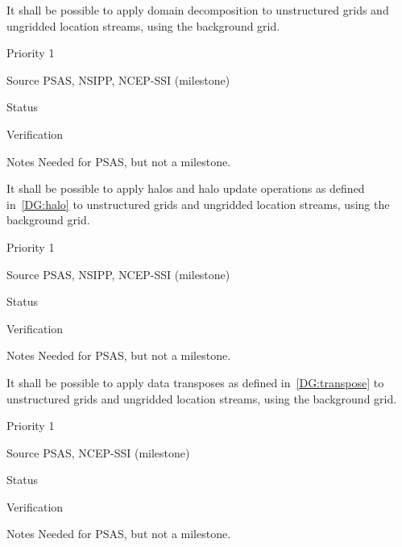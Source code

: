 
It shall be possible to apply domain decomposition to unstructured
grids and ungridded location streams, using the background grid.

\begin{reqlist}
\item[Priority] 1
\item[Source] PSAS, NSIPP, NCEP-SSI (milestone)
\item[Status] 
\item[Verification]
\item[Notes]  Needed for PSAS, but not a milestone.
\end{reqlist}


It shall be possible to apply halos and halo update operations as
defined in~\ref{DG:halo} to unstructured grids and ungridded location
streams, using the background grid.

\begin{reqlist}
\item[Priority] 1
\item[Source] PSAS, NSIPP, NCEP-SSI (milestone)
\item[Status]
\item[Verification]
\item[Notes] Needed for PSAS, but not a milestone.
\end{reqlist}


It shall be possible to apply data transposes as defined
in~\ref{DG:transpose} to unstructured grids and ungridded location
streams, using the background grid.

\begin{reqlist}
\item[Priority] 1
\item[Source] PSAS, NCEP-SSI (milestone)
\item[Status]
\item[Verification]
\item[Notes] Needed for PSAS, but not a milestone.
\end{reqlist}


